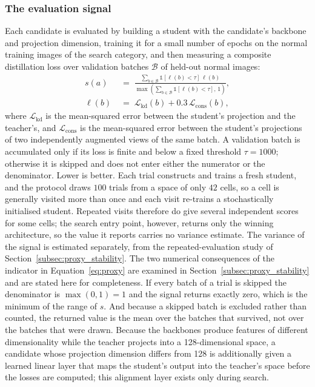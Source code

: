 \subsubsection*{The evaluation signal}
Each candidate is evaluated by building a student with the candidate's backbone
and projection dimension, training it for a small number of epochs on the normal
training images of the search category, and then measuring a composite
distillation loss over validation batches $\mathcal{B}$ of held-out normal images:
%
\begin{equation}
\label{eq:proxy}
\begin{aligned}
s(a) &\;=\; \frac{\sum_{b \in \mathcal{B}} \mathbb{1}\!\left[\ell(b) < \tau\right]\,\ell(b)}
{\max\!\left(\sum_{b \in \mathcal{B}} \mathbb{1}\!\left[\ell(b) < \tau\right],\, 1\right)},\\[3pt]
\ell(b) &\;=\; \mathcal{L}_{\mathrm{kd}}(b) + 0.3\,\mathcal{L}_{\mathrm{cons}}(b),
\end{aligned}
\end{equation}
%
where $\mathcal{L}_{\mathrm{kd}}$ is the mean-squared error between the student's
projection and the teacher's, and $\mathcal{L}_{\mathrm{cons}}$ is the
mean-squared error between the student's projections of two independently
augmented views of the same batch. A validation batch is accumulated only if its
loss is finite and below a fixed threshold $\tau = 1000$; otherwise it is skipped
and does not enter either the numerator or the denominator. Lower is better. Each
trial constructs and trains a fresh student, and the protocol draws $100$ trials
from a space of only $42$ cells, so a cell is generally visited more than once and
each visit re-trains a stochastically initialised student. Repeated visits therefore
do give several independent scores for some cells; the search entry point, however,
returns only the winning architecture, so the value it reports carries no variance
estimate. The variance of the signal is estimated
separately, from the repeated-evaluation study of
Section~\ref{subsec:proxy_stability}.
The two numerical consequences of the indicator in
Equation~\eqref{eq:proxy} are examined in
Section~\ref{subsec:proxy_stability} and are stated here for completeness. If every
batch of a trial is skipped the denominator is $\max(0,1) = 1$ and the signal
returns exactly zero, which is the minimum of the range of $s$. And because a
skipped batch is excluded rather than counted, the returned value is the mean over
the batches that survived, not over the batches that were drawn. Because the
backbones produce features of different
dimensionality while the teacher projects into a 128-dimensional space, a
candidate whose projection dimension differs from 128 is additionally given a
learned linear layer that maps the student's output into the teacher's space
before the losses are computed; this alignment layer exists only during search.

